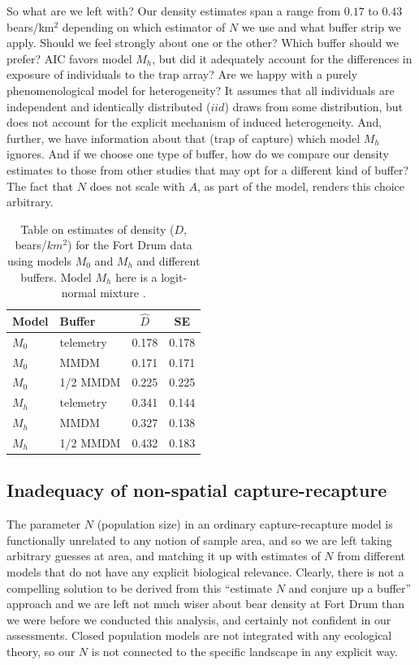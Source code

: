 So what are we left with?  Our density estimates span a range from
$0.17$ to $0.43$ bears/km$^2$ depending on which estimator of $N$ we
use and what buffer strip we apply. Should we feel strongly about one
or the other?  Which buffer should we prefer?  AIC favors model $M_h$,
but did it adequately account for the differences in exposure of
individuals to the trap array? Are we happy with a purely
phenomenological model for heterogeneity?  It assumes that all
individuals are independent and identically distributed ($iid$) draws
from some distribution, but does not account for the explicit
mechanism of induced heterogeneity. And, further, we have information
about that (trap of capture) which model $M_h$ ignores.
And if we choose one type of buffer, how do we compare our density
estimates to those from other studies that may opt for a different
kind of buffer?  The fact that $N$ does not scale with $A$, as part of
the model, renders this choice arbitrary.



\begin{table}[ht]
\centering
\caption{Table on estimates of density ($D$, bears/$km^2$) for the Fort Drum data
using models $M_0$ and $M_h$ and different buffers. Model $M_h$ here
is a logit-normal mixture \citep{coull_agresti:1999}.}
\begin{tabular}{ll|cc}
\hline \hline
Model & Buffer &  $\hat{D}$ & SE \\ \hline
$M_0$   & telemetry &  0.178 & 0.178 \\
$M_0$    & MMDM     &  0.171 & 0.171\\
$M_0$   & 1/2 MMDM  &  0.225 & 0.225\\
$M_h$ & telemetry &0.341 & 0.144\\
$M_h$ & MMDM    &  0.327 & 0.138\\
$M_h$ & 1/2 MMDM & 0.432 & 0.183\\ \hline
\end{tabular}
\label{intro.tab.fdests}
\end{table}


\subsection{Inadequacy of non-spatial capture-recapture}

The parameter $N$ (population size) in an ordinary capture-recapture
model is functionally unrelated to any notion of sample area, and so
we are left taking arbitrary guesses at area, and matching it up with
estimates of $N$ from different models that do not have any explicit
biological relevance.  Clearly, there is not a compelling solution to
be derived from this ``estimate $N$ and conjure up a buffer'' approach
and we are left not much wiser about bear density at Fort Drum than we
were before we conducted this analysis, and certainly not confident in
our assessments.  Closed population models are not integrated with any
ecological theory, so our $N$ is not connected to the specific
landscape in any explicit way.

